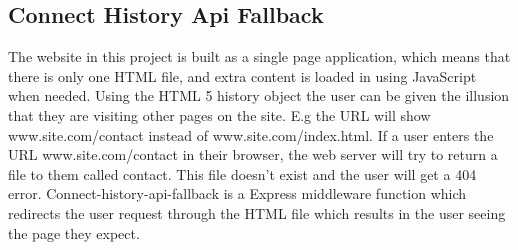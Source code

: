 \subsection{Connect History Api Fallback}
The website in this project is built as a single page application, which means that there is only one HTML file, and extra content is loaded in using JavaScript when needed. Using the HTML 5 history object\cite{HTML5HistoryObject:Info} the user can be given the illusion that they are visiting other pages on the site. E.g the URL will show www.site.com/contact instead of www.site.com/index.html. If a user enters the URL www.site.com/contact in their browser, the web server will try to return a file to them called contact. This file doesn't exist and the user will get a 404 error. Connect-history-api-fallback\cite{CHAF:Info} is a Express middleware function which redirects the user request through the HTML file which results in the user seeing the page they expect.